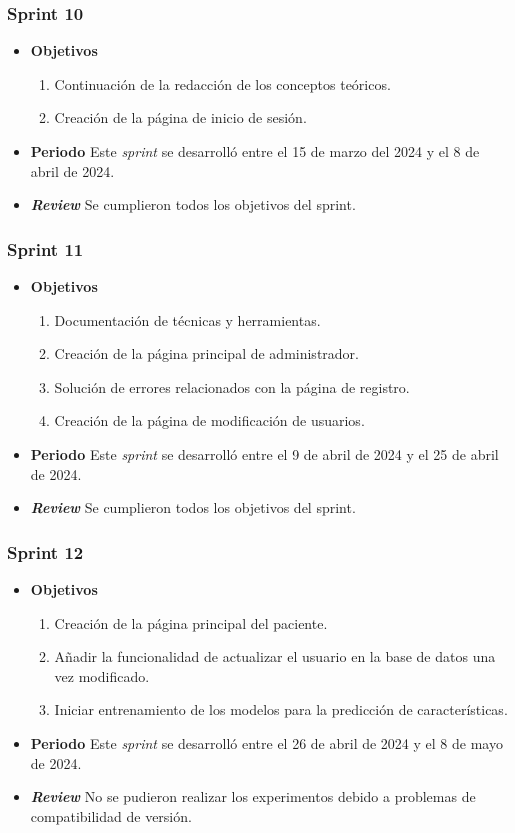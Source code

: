 \subsubsection{Sprint 10}
\begin{itemize}
\item \textbf{Objetivos}
\begin{enumerate}
\item Continuación de la redacción de los conceptos teóricos.
\item Creación de la página de inicio de sesión.
\end{enumerate}
\item \textbf{Periodo}
Este \textsl{sprint} se desarrolló entre el 15 de marzo del 2024 y el 8 de abril de 2024.
\item \textbf{\textsl{Review}}
Se cumplieron todos los objetivos del sprint.  
\end{itemize}

\subsubsection{Sprint 11}
\begin{itemize}
\item \textbf{Objetivos}
\begin{enumerate}
\item Documentación de técnicas y herramientas.
\item Creación de la página principal de administrador.
\item Solución de errores relacionados con la página de registro.
\item Creación de la página de modificación de usuarios.
\end{enumerate}
\item \textbf{Periodo}
Este \textsl{sprint} se desarrolló entre el 9 de abril de 2024 y el 25 de abril de 2024.
\item \textbf{\textsl{Review}}
Se cumplieron todos los objetivos del sprint. 
\end{itemize}

\subsubsection{Sprint 12}
\begin{itemize}
\item \textbf{Objetivos}
\begin{enumerate}
\item Creación de la página principal del paciente.
\item Añadir la funcionalidad de actualizar el usuario en la base de datos una vez modificado.
\item Iniciar entrenamiento de los modelos para la predicción de características.
\end{enumerate}
\item \textbf{Periodo}
Este \textsl{sprint} se desarrolló entre el 26 de abril de 2024 y el 8 de mayo de 2024.
\item \textbf{\textsl{Review}}
No se pudieron realizar los experimentos debido a problemas de compatibilidad de versión. 
\end{itemize}

